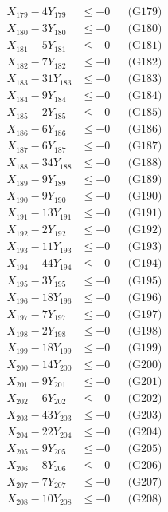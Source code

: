 \documentclass[a4paper,10pt]{article}
\begin{document}
{\begin{align}
X_{179} - 4Y_{179} &\leq +0 && \text{(G179)} \\
X_{180} - 3Y_{180} &\leq +0 && \text{(G180)} \\
X_{181} - 5Y_{181} &\leq +0 && \text{(G181)} \\
X_{182} - 7Y_{182} &\leq +0 && \text{(G182)} \\
X_{183} - 31Y_{183} &\leq +0 && \text{(G183)} \\
\allowbreak
X_{184} - 9Y_{184} &\leq +0 && \text{(G184)} \\
X_{185} - 2Y_{185} &\leq +0 && \text{(G185)} \\
X_{186} - 6Y_{186} &\leq +0 && \text{(G186)} \\
X_{187} - 6Y_{187} &\leq +0 && \text{(G187)} \\
X_{188} - 34Y_{188} &\leq +0 && \text{(G188)} \\
X_{189} - 9Y_{189} &\leq +0 && \text{(G189)} \\
X_{190} - 9Y_{190} &\leq +0 && \text{(G190)} \\
X_{191} - 13Y_{191} &\leq +0 && \text{(G191)} \\
X_{192} - 2Y_{192} &\leq +0 && \text{(G192)} \\
X_{193} - 11Y_{193} &\leq +0 && \text{(G193)} \\
\allowbreak
X_{194} - 44Y_{194} &\leq +0 && \text{(G194)} \\
X_{195} - 3Y_{195} &\leq +0 && \text{(G195)} \\
X_{196} - 18Y_{196} &\leq +0 && \text{(G196)} \\
X_{197} - 7Y_{197} &\leq +0 && \text{(G197)} \\
X_{198} - 2Y_{198} &\leq +0 && \text{(G198)} \\
X_{199} - 18Y_{199} &\leq +0 && \text{(G199)} \\
X_{200} - 14Y_{200} &\leq +0 && \text{(G200)} \\
X_{201} - 9Y_{201} &\leq +0 && \text{(G201)} \\
X_{202} - 6Y_{202} &\leq +0 && \text{(G202)} \\
X_{203} - 43Y_{203} &\leq +0 && \text{(G203)} \\
\allowbreak
X_{204} - 22Y_{204} &\leq +0 && \text{(G204)} \\
X_{205} - 9Y_{205} &\leq +0 && \text{(G205)} \\
X_{206} - 8Y_{206} &\leq +0 && \text{(G206)} \\
X_{207} - 7Y_{207} &\leq +0 && \text{(G207)} \\
X_{208} - 10Y_{208} &\leq +0 && \text{(G208)} \\

\end{align}}
\end{document}
